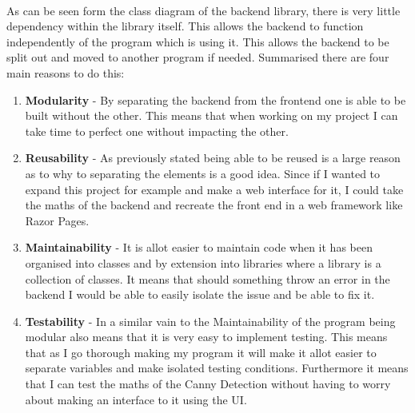 \begin{FlushLeft}
    \begin{figure}[H]
        \centering
    \end{figure}

    \\

    As can be seen form the class diagram of the backend library, there is very little dependency within the library itself. This allows the backend to function independently of the program which is using it. This allows the backend to be split out and moved to another program if needed. Summarised there are four main reasons to do this:

    \begin{enumerate}
        \item \textbf{Modularity} - By separating the backend from the frontend one is able to be built without the other. This means that when working on my project I can take time to perfect one without impacting the other.
        \item \textbf{Reusability} - As previously stated being able to be reused is a large reason as to why to separating the elements is a good idea. Since if I wanted to expand this project for example and make a web interface for it, I could take the maths of the backend and recreate the front end in a web framework like Razor Pages.
        \item \textbf{Maintainability} - It is allot easier to maintain code when it has been organised into classes and by extension into libraries where a library is a collection of classes. It means that should something throw an error in the backend I would be able to easily isolate the issue and be able to fix it.
        \item \textbf{Testability} - In a similar vain to the Maintainability of the program being modular also means that it is very easy to implement testing. This means that as I go thorough making my program it will make it allot easier to separate variables and make isolated testing conditions. Furthermore it means that I can test the maths of the Canny Detection without having to worry about making an interface to it using the UI.
    \\ \BK


\end{enumerate}
\end{FlushLeft}
